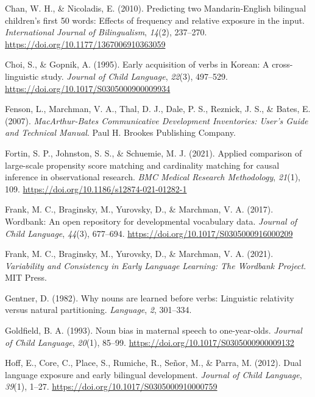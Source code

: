 \documentclass[10pt, letterpaper]{article}
\begin{document}
\begin{CSLReferences}{1}{0}
Chan, W. H., \& Nicoladis, E. (2010). Predicting two {Mandarin-English}
bilingual children's first 50 words: {Effects} of frequency and relative
exposure in the input. \emph{International Journal of Bilingualism},
\emph{14}(2), 237--270. \url{https://doi.org/10.1177/1367006910363059}

Choi, S., \& Gopnik, A. (1995). Early acquisition of verbs in {Korean}:
A cross-linguistic study. \emph{Journal of Child Language},
\emph{22}(3), 497--529. \url{https://doi.org/10.1017/S0305000900009934}

Fenson, L., Marchman, V. A., Thal, D. J., Dale, P. S., Reznick, J. S.,
\& Bates, E. (2007). \emph{{MacArthur-Bates Communicative Development
Inventories}: {User}'s {Guide} and {Technical Manual}}. Paul H. Brookes
Publishing Company.

Fortin, S. P., Johnston, S. S., \& Schuemie, M. J. (2021). Applied
comparison of large-scale propensity score matching and cardinality
matching for causal inference in observational research. \emph{BMC
Medical Research Methodology}, \emph{21}(1), 109.
\url{https://doi.org/10.1186/s12874-021-01282-1}

Frank, M. C., Braginsky, M., Yurovsky, D., \& Marchman, V. A. (2017).
Wordbank: An open repository for developmental vocabulary data.
\emph{Journal of Child Language}, \emph{44}(3), 677--694.
\url{https://doi.org/10.1017/S0305000916000209}

Frank, M. C., Braginsky, M., Yurovsky, D., \& Marchman, V. A. (2021).
\emph{Variability and {Consistency} in {Early Language Learning}: {The
Wordbank Project}}. MIT Press.

Gentner, D. (1982). Why nouns are learned before verbs: {Linguistic}
relativity versus natural partitioning. \emph{Language}, \emph{2},
301--334.

Goldfield, B. A. (1993). Noun bias in maternal speech to one-year-olds.
\emph{Journal of Child Language}, \emph{20}(1), 85--99.
\url{https://doi.org/10.1017/S0305000900009132}

Hoff, E., Core, C., Place, S., Rumiche, R., Señor, M., \& Parra, M.
(2012). Dual language exposure and early bilingual development.
\emph{Journal of Child Language}, \emph{39}(1), 1--27.
\url{https://doi.org/10.1017/S0305000910000759}


\end{CSLReferences}
\end{document}
